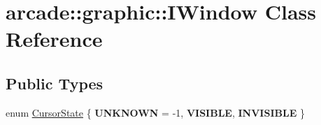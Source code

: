 \hypertarget{classarcade_1_1graphic_1_1_i_window}{}\section{arcade\+::graphic\+::I\+Window Class Reference}
\label{classarcade_1_1graphic_1_1_i_window}
\subsection*{Public Types}
\begin{DoxyCompactItemize}
\item 
enum \mbox{\hyperlink{classarcade_1_1graphic_1_1_i_window_aa88d1788d30d459f166dd29dbe5b5f7f}{Cursor\+State}} \{ {\bfseries U\+N\+K\+N\+O\+WN} = -\/1, 
{\bfseries V\+I\+S\+I\+B\+LE}, 
{\bfseries I\+N\+V\+I\+S\+I\+B\+LE}
 \}
\end{DoxyCompactItemize}
